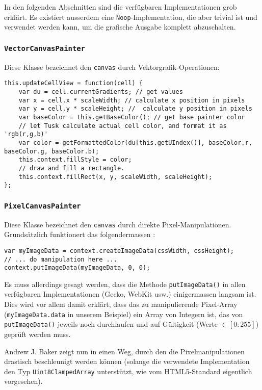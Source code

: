 \documentclass[11pt]{article} %
\theoremstyle{definition}
\begin{document}
In den folgenden Abschnitten sind die verfügbaren Implementationen grob erklärt. Es existiert ausserdem eine {\tt Noop}-Implementation, die aber trivial ist und verwendet werden kann, um die grafische Ausgabe komplett abzuschalten.

\subsubsection{{\tt VectorCanvasPainter}}

Diese Klasse bezeichnet den {\tt canvas} durch Vektorgrafik-Operationen:

\begin{lstlisting}
this.updateCellView = function(cell) {
	var du = cell.currentGradients; // get values
	var x = cell.x * scaleWidth; // calculate x position in pixels
	var y = cell.y * scaleHeight; //  calculate y position in pixels
	var baseColor = this.getBaseColor(); // get base painter color
	// let Tusk calculate actual cell color, and format it as 'rgb(r,g,b)'
	var color = getFormattedColor(du[this.getUIndex()], baseColor.r, baseColor.g, baseColor.b);
	this.context.fillStyle = color;
	// draw and fill a rectangle.
	this.context.fillRect(x, y, scaleWidth, scaleHeight);
};
\end{lstlisting}

\subsubsection{{\tt PixelCanvasPainter}}

Diese Klasse bezeichnet den {\tt canvas} durch direkte Pixel-Manipulationen. Grundsätzlich funktionert das folgendermassen \cite{mdn:PixelCanvasDoku}:

\begin{lstlisting}
var myImageData = context.createImageData(cssWidth, cssHeight);
// ... do manipulation here ...
context.putImageData(myImageData, 0, 0);
\end{lstlisting}

Es muss allerdings gesagt werden, dass die Methode {\tt putImageData()} in allen verfügbaren Implementationen (Gecko, WebKit usw.) einigermassen langsam ist. Dies wird vor allem damit erklärt, dass das zu manipulierende Pixel-Array ({\tt myImageData.data} in unserem Beispiel) ein Array von Integern ist, das von {\tt putImageData()} jeweils noch durchlaufen und auf Gültigkeit (Werte $\in [0: 255]$) geprüft werden muss.

Andrew J. Baker zeigt nun in \cite{mdn:PixelCanvas} einen Weg, durch den die Pixelmanipulationen drastisch beschleunigt werden können (solange die verwendete Implementation den Typ {\tt Uint8ClampedArray} unterstützt, wie vom HTML5-Standard  \cite{wthree:twodcanvas} eigentlich vorgesehen).
\end{document}
